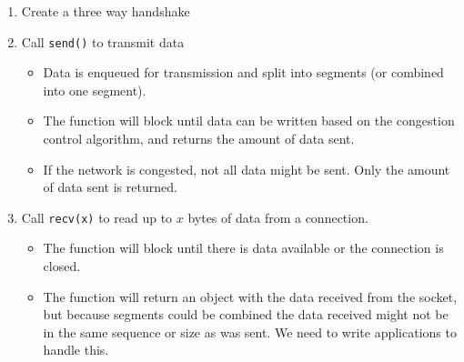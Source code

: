 \begin{enumerate}
	\item Create a three way handshake
	\item Call \texttt{send()} to transmit data
	      \begin{itemize}
		      \item Data is enqueued for transmission and split into segments (or combined into one segment).
		      \item The function will block until data can be written based on the congestion control algorithm, and returns the amount of data sent.
		      \item If the network is congested, not all data might be sent.
		            Only the amount of data sent is returned.
	      \end{itemize}
	\item Call \texttt{recv(x)} to read up to \(x\) bytes of data from a connection.
	      \begin{itemize}
		      \item The function will block until there is data available or the connection is closed.
		      \item The function will return an object with the data received from the socket, but because segments could be combined the data received might not be in the same sequence or size as was sent.
		            We need to write applications to handle this.
	      \end{itemize}
\end{enumerate}
